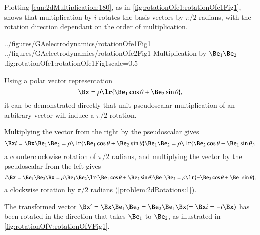 %
%

Plotting \cref{eqn:2dMultiplication:180}, as in
\cref{fig:rotationOfe1:rotationOfe1Fig1},
 shows that multiplication by \( i \) rotates the  basis vectors by \( \pi/2 \) radians,
with the
rotation direction dependant on the order of multiplication.

\imageTwoFigures
{../figures/GAelectrodynamics/rotationOfe1Fig1}
{../figures/GAelectrodynamics/rotationOfe2Fig1}
{Multiplication by \( \Be_1 \Be_2 \).}{fig:rotationOfe1:rotationOfe1Fig1}{scale=0.5}

Using a polar vector representation
\begin{dmath}\label{eqn:2dRotations:280}
   \Bx = \rho \lr{ \Be_1 \cos\theta + \Be_2 \sin\theta },
\end{dmath}
it can be demonstrated directly that
unit pseudoscalar multiplication of an arbitrary vector will induce a \( \pi/2 \) rotation.

Multiplying the vector from the right by the pseudoscalar gives
\begin{dmath}\label{eqn:2dRotations:300}
\Bx i
= \Bx \Be_1 \Be_2
= \rho \lr{ \Be_1 \cos\theta + \Be_2 \sin\theta } \Be_1 \Be_2
= \rho \lr{ \Be_2 \cos\theta - \Be_1 \sin\theta },
\end{dmath}
a counterclockwise rotation of \( \pi/2 \) radians, and
multiplying the vector by the pseudoscalar from the left gives
\begin{dmath}\label{eqn:2dRotations:3}
i \Bx
= \Be_1 \Be_2 \Bx
= \rho \Be_1 \Be_2 \lr{ \Be_1 \cos\theta + \Be_2 \sin\theta } \Be_1 \Be_2
= \rho \lr{ -\Be_2 \cos\theta + \Be_1 \sin\theta },
\end{dmath}
a clockwise rotation by \( \pi/2 \) radians
(\cref{problem:2dRotations:1}).

The transformed vector \( \Bx' = \Bx \Be_1 \Be_2 = \Be_2 \Be_1 \Bx (=\Bx i = -i \Bx) \) has been rotated in the direction that takes \( \Be_1 \) to \( \Be_2 \), as illustrated
in \cref{fig:rotationOfV:rotationOfVFig1}.


